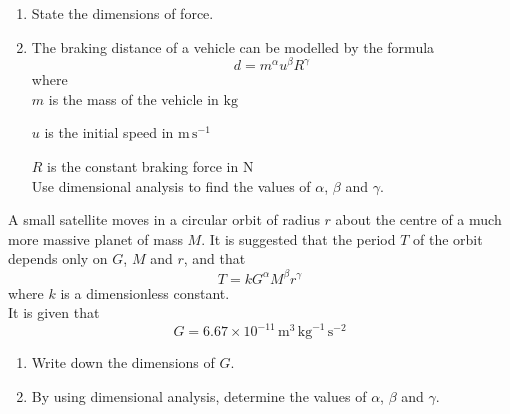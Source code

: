 \documentclass[leqno]{article}
\begin{document}
\djsFrontMatter
\begin{enumerate}[
  label=\textbf{\arabic*.},
  leftmargin=*,
  topsep=0pt,
  partopsep=0pt,
  parsep=0pt
]

\questionitem

\begin{enumerate}[label=\textbf{(\alph*)}]
  \item State the dimensions of force.  \\
  \item The braking distance of a vehicle can be modelled by the formula
  \[
  d = m^{\alpha} u^{\beta} R^{\gamma}
  \] 
  where \\

  $m$ is the mass of the vehicle in $\mathrm{kg}$

  $u$ is the initial speed in $\mathrm{m\,s^{-1}}$

  $R$ is the constant braking force in $\mathrm{N}$ \\
  
  Use dimensional analysis to find the values of $\alpha$, $\beta$ and $\gamma$.  \\
\end{enumerate}

\newpage

\questionitem

A small satellite moves in a circular orbit of radius $r$ about the centre of a much more massive planet of mass $M$. It is suggested that the period $T$ of the orbit depends only on $G$, $M$ and $r$, and that
\[
T = kG^{\alpha} M^{\beta} r^{\gamma}
\]
where $k$ is a dimensionless constant. \\

It is given that
\[
G = 6.67 \times 10^{-11}\,\mathrm{m}^3\,\mathrm{kg}^{-1}\,\mathrm{s}^{-2}
\]
\begin{enumerate}[label=\textbf{(\alph*)}, start=1]
  \item Write down the dimensions of $G$.  \\
  \item By using dimensional analysis, determine the values of $\alpha$, $\beta$ and $\gamma$.  \\
\end{enumerate}

\newpage

\questionitem


\end{enumerate}
\end{document}
